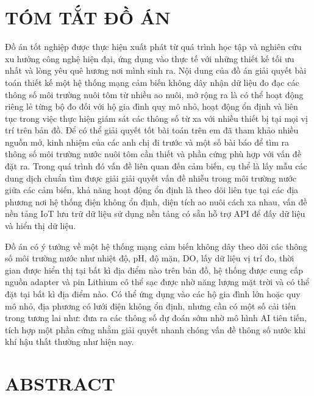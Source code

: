 \section*{TÓM TẮT ĐỒ ÁN}
Đồ án tốt nghiệp được thực hiện xuất phát từ quá trình học tập và nghiên cứu xu hướng công nghệ hiện đại, ứng dụng vào thực tế với những thiết kế tối ưu nhất và lòng yêu quê hương nơi mình sinh ra. Nội dung của đồ án giải quyết bài toán thiết kế một hệ thống mạng cảm biến không dây nhận dữ liệu đo đạc các thông số môi trường nuôi tôm từ nhiều ao nuôi, mở rộng ra là có thể hoạt động riêng lẻ từng bộ đo đối với hộ gia đình quy mô nhỏ, hoạt động ổn định và liên tục trong việc thực hiện giám sát các thông số từ xa với nhiều thiết bị tại mọi vị trí trên bản đồ. Để có thể giải quyết tốt bài toán trên em đã tham khảo nhiều nguồn mở, kinh nhiệm của các anh chị đi trước và một số bài báo để tìm ra thông số môi trường nước nuôi tôm cần thiết và phần cứng phù hợp với vấn đề đặt ra. Trong quá trình đó vấn đề liên quan đến cảm biến, cụ thể là lấy mẫu các dung dịch chuẩn tìm được giải giải quyết vấn đề nhiễu trong môi trường nước giữa các cảm biến, khả năng hoạt động ổn định là theo dõi liên tục tại các địa phương nơi hệ thống điện không ổn định, diện tích ao nuôi cách xa nhau, vấn đề nền tảng IoT lưu trữ dữ liệu sử dụng nền tảng có sẵn hỗ trợ API để đấy dữ liệu và hiển thị dữ liệu. 

Đồ án có ý tưởng về một hệ thống mạng cảm biến không dây theo dõi các thông số môi trường nước như nhiệt độ, pH, độ mặn, DO, lấy dữ liệu vị trí đo, thời gian được hiển thị tại bất kì địa điểm nào trên bản đồ, hệ thống được cung cấp nguồn adapter và pin Lithium có thể sạc được nhờ năng lượng mặt trời và có thể đặt tại bất kì địa điểm nào. Có thể ứng dụng vào các hộ gia đình lớn hoặc quy mô nhỏ, địa phương có lưới điện không ổn định, nhưng cần có một số cải tiến trong tương lai như: đưa ra các thông số dự đoán sớm nhờ mô hình AI tiên tiến, tích hợp một phần cứng nhằm giải quyết nhanh chóng vấn đề thông số nước khi khí hậu thất thường như hiện nay.
\clearpage

\section*{ABSTRACT}

